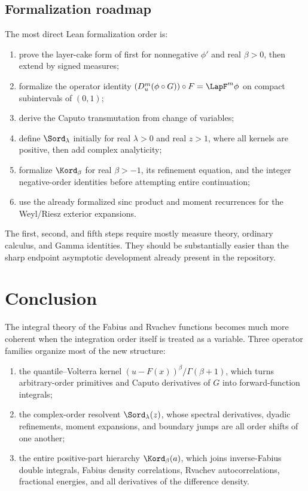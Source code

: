 \documentclass[11pt,oneside]{article}
\theoremstyle{definition}
\theoremstyle{remark}
\newcommand{\1}{\mathbf 1}
\begin{document}
\subsection{Formalization roadmap}

The most direct Lean formalization order is:

\begin{enumerate}
\item prove the layer-cake form of  first for
      nonnegative $\phi'$ and real $\beta>0$, then extend by signed measures;
\item formalize the operator identity
      $(D_u^m(\phi\circ G))\circ F=\LapF^m\phi$ on compact subintervals of
      $(0,1)$;
\item derive the Caputo transmutation from change of variables;
\item define $\Sord_\lambda$ initially for real $\lambda>0$ and real $z>1$,
      where all kernels are positive, then add complex analyticity;
\item formalize $\Kord_\beta$ for real $\beta>-1$, its refinement equation,
      and the integer negative-order identities before attempting entire
      continuation;
\item use the already formalized sinc product and moment recurrences for the
      Weyl/Riesz exterior expansions.
\end{enumerate}

The first, second, and fifth steps require mostly measure theory, ordinary
calculus, and Gamma identities.  They should be substantially easier than the
sharp endpoint asymptotic development already present in the repository.

\section{Conclusion}
\label{p11:sec:conclusion}

The integral theory of the Fabius and Rvachev functions becomes much more
coherent when the integration order itself is treated as a variable.  Three
operator families organize most of the new structure:

\begin{enumerate}
\item the quantile--Volterra kernel
      $(u-F(x))^\beta/\Gamma(\beta+1)$, which turns arbitrary-order
      primitives and Caputo derivatives of $G$ into forward-function
      integrals;
\item the complex-order resolvent $\Sord_\lambda(z)$, whose spectral
      derivatives, dyadic refinements, moment expansions, and boundary jumps
      are all order shifts of one another;
\item the entire positive-part hierarchy $\Kord_\beta(a)$, which joins
      inverse-Fabius double integrals, Fabius density correlations, Rvachev
      autocorrelations, fractional energies, and all derivatives of the
      difference density.
\end{enumerate}
\end{document}
